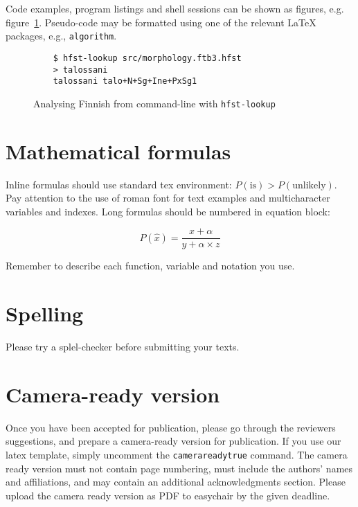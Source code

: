 \documentclass[a4paper,notitlepage]{article}
\newif\ifcameraready
\begin{document}
Code examples, program listings and shell sessions can be shown as figures,
e.g. figure~\ref{code:analysis}.
Pseudo-code may be formatted using one of the relevant \LaTeX{} packages, e.g.,
\texttt{algorithm}.

\begin{figure}
    \center
    \begin{verbatim}
    $ hfst-lookup src/morphology.ftb3.hfst
    > talossani
    talossani talo+N+Sg+Ine+PxSg1
    \end{verbatim}
    \caption{Analysing Finnish from command-line with \texttt{hfst-lookup}
    \label{code:analysis}}
\end{figure}

\section{Mathematical formulas}

Inline formulas should use standard tex environment: $P(\mathrm{is}) >
P(\mathrm{unlikely})$. Pay attention to the use of roman font for text examples
and multicharacter variables and indexes. Long formulas should be numbered in
equation block:

\begin{equation}
    P(\hat x) = \frac{x+\alpha}{y+\alpha\times z}
\end{equation}

Remember to describe each function, variable and notation you use.

\section{Spelling}

Please try a splel-checker before submitting your texts.

\section{Camera-ready version}

Once you have been accepted for publication, please go through the reviewers
suggestions, and prepare a camera-ready version for publication. If you use our
latex template, simply uncomment the \texttt{camerareadytrue} command. The
camera ready version must not contain page numbering, must include the authors'
names and affiliations, and may contain an additional acknowledgments section.
Please upload the camera ready version as PDF to easychair by the given
deadline.

\ifcameraready
\section*{Acknowledgments}

Acknowledgments should be un-numbered last section. Do not include
acknowledgements in anonymised review version.
\fi



\end{document}
